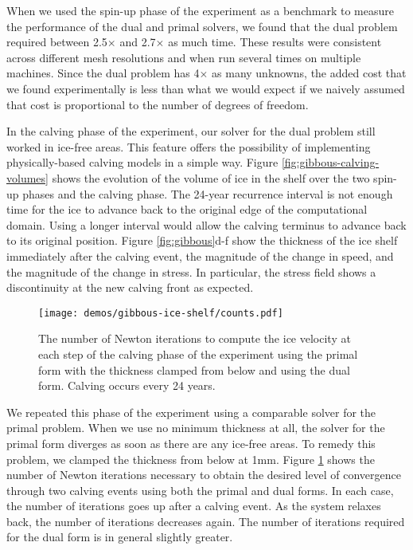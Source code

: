 \documentclass[review,oneside]{igs}
\begin{document}
When we used the spin-up phase of the experiment as a benchmark to measure the performance of the dual and primal solvers, we found that the dual problem required between 2.5$\times$ and 2.7$\times$ as much time.
These results were consistent across different mesh resolutions and when run several times on multiple machines.
Since the dual problem has 4$\times$ as many unknowns, the added cost that we found experimentally is less than what we would expect if we naively assumed that cost is proportional to the number of degrees of freedom.

In the calving phase of the experiment, our solver for the dual problem still worked in ice-free areas.
This feature offers the possibility of implementing physically-based calving models in a simple way.
Figure \ref{fig:gibbous-calving-volumes} shows the evolution of the volume of ice in the shelf over the two spin-up phases and the calving phase.
The 24-year recurrence interval is not enough time for the ice to advance back to the original edge of the computational domain.
Using a longer interval would allow the calving terminus to advance back to its original position.
Figure \ref{fig:gibbous}d-f show the thickness of the ice shelf immediately after the calving event, the magnitude of the change in speed, and the magnitude of the change in stress.
In particular, the stress field shows a discontinuity at the new calving front as expected.

\begin{figure}[h]
    \begin{center}
        \texttt{[image: demos/gibbous-ice-shelf/counts.pdf]}
    \end{center}
    \caption{The number of Newton iterations to compute the ice velocity at each step of the calving phase of the experiment using the primal form with the thickness clamped from below and using the dual form.
    Calving occurs every 24 years.}
    \label{fig:gibbous-residuals}
\end{figure}

We repeated this phase of the experiment using a comparable solver for the primal problem.
When we use no minimum thickness at all, the solver for the primal form diverges as soon as there are any ice-free areas.
To remedy this problem, we clamped the thickness from below at 1mm.
Figure \ref{fig:gibbous-residuals} shows the number of Newton iterations necessary to obtain the desired level of convergence through two calving events using both the primal and dual forms.
In each case, the number of iterations goes up after a calving event.
As the system relaxes back, the number of iterations decreases again.
The number of iterations required for the dual form is in general slightly greater.
\end{document}
